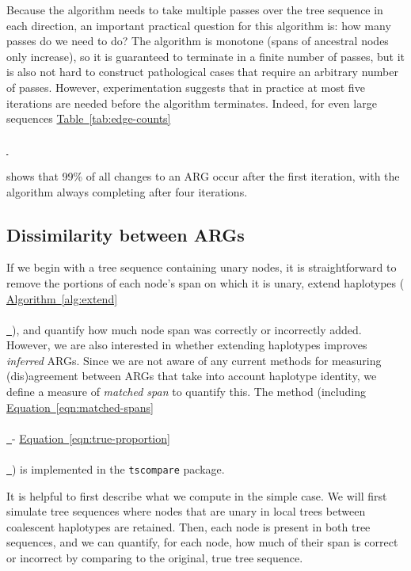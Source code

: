 \documentclass[10pt,twoside,lineno]{gsajnl}
\newcommand{\tscompare}{\texttt{tscompare}}
\newcommand{\algorithmref}[2][]{%
	\hyperref[{#2}]{%
		Algorithm~\ref*{#2}%
		\ifx\\#1\\%
		\else
		\,#1%
		\fi
	}%
}
\newcommand*{\tabref}[2][]{%
	\hyperref[{#2}]{%
		Table~\ref*{#2}%
		\ifx\\#1\\%
		\else
		\,#1%
		\fi
	}%
}
\newcommand*{\eqnref}[2][]{%
	\hyperref[{#2}]{%
		Equation~\ref*{#2}%
		\ifx\\#1\\%
		\else
		\,#1%
		\fi
	}%
}
\begin{document}
Because the algorithm needs to take multiple passes over the tree sequence
in each direction,
an important practical question for this algorithm is:
how many passes do we need to do?
The algorithm is monotone (spans of ancestral nodes only increase),
so it is guaranteed to terminate in a finite number of passes,
but it is also not hard to construct pathological cases that require an arbitrary number of passes.
However, experimentation suggests that 
in practice at most five iterations are needed before the algorithm terminates.
Indeed, for even large sequences \tabref{tab:edge-counts}
shows that 99\% of all changes to an ARG occur after the first iteration,
with the algorithm always completing after four iterations. 


\subsection{Dissimilarity between ARGs}

If we begin with a tree sequence containing unary nodes,
it is straightforward to remove the portions of each node's span on which it is unary,
extend haplotypes (\algorithmref{alg:extend}),
and quantify how much node span was correctly or incorrectly added.
However, we are also interested in whether extending haplotypes
improves \emph{inferred} ARGs.
Since we are not aware of any current methods for measuring (dis)agreement between ARGs
that take into account haplotype identity,
we define a measure of \emph{matched span} to quantify this.
The method (including \eqnref{eqn:matched-spans} - \eqnref{eqn:true-proportion}) 
 is implemented in the \tscompare{} package.

It is helpful to first describe what we compute in the simple case.
We will first simulate tree sequences where
nodes that are unary in local trees between coalescent haplotypes are retained.
Then, each node is present in both tree sequences,
and we can quantify, for each node, how much of their span is correct or incorrect
by comparing to the original, true tree sequence.
\end{document}
